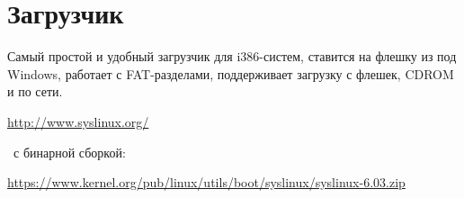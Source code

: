 \section{Загрузчик }

Самый простой и удобный загрузчик для i386-систем, ставится на флешку
из под Windows, работает с FAT-разделами, поддерживает загрузку с флешек, CDROM
и по сети.

\bigskip
\url{http://www.syslinux.org/}
\bigskip

\ с бинарной сборкой:

\url{https://www.kernel.org/pub/linux/utils/boot/syslinux/syslinux-6.03.zip}

